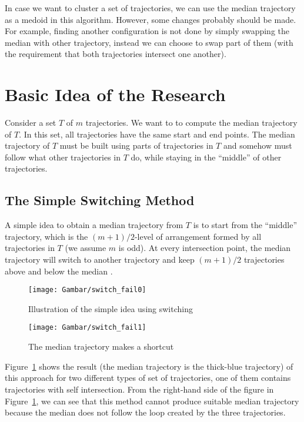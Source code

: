 In case we want to cluster a set of trajectories, we can use the median trajectory as a medoid in this algorithm.
However, some changes probably should be made.
For example, finding another configuration is not done by simply swapping the median with other trajectory, instead we can choose to swap part of them (with the requirement that both trajectories intersect one another).

\section{Basic Idea of the Research}
\label{sec:basic_idea}

Consider a set $T$ of $m$ trajectories.
We want to to compute the median trajectory of $T$.
In this set, all trajectories have the same start and end points.
The median trajectory of $T$ must be built using parts of trajectories in $T$ and somehow must follow what other trajectories in $T$ do, while staying in the ``middle'' of other trajectories.

\subsection{The Simple Switching Method }
\label{sec:switch}

A simple idea to obtain a median trajectory from $T$ is to start from the ``middle'' trajectory, which is the $(m+1)/2$-level of arrangement formed by all trajectories in $T$ (we assume $m$ is odd).
At every intersection point, the median trajectory will switch to another trajectory and keep $(m+1)/2$ trajectories above and below the median \cite{Buchin:2010}.

\begin{figure}
\centering
\texttt{[image: Gambar/switch\_fail0]}
\caption[Illustration of the simple idea using switching]{Illustration of the simple idea using switching} 
\label{fig:switch_fail0}
\end{figure}

\begin{figure}
\centering
\texttt{[image: Gambar/switch\_fail1]}
\caption[The median trajectory make a shortcut path \cite{Lionov:2009}]{The median trajectory makes a shortcut \cite{Lionov:2009}} 
\label{fig:switch_fail1}
\end{figure} 

Figure~\ref{fig:switch_fail0} shows the result (the median trajectory is the thick-blue trajectory) of this approach for two different types of set of trajectories, one of them contains trajectories with self intersection.
From the right-hand side of the figure in Figure~\ref{fig:switch_fail0}, we can see that this method cannot produce suitable median trajectory because the median does not follow the loop created by the three trajectories.

